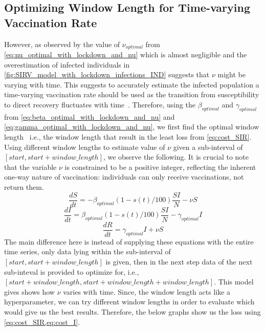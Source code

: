 \documentclass[tikz,fleqn,12pt]{wlscirep}
\begin{document}
\subsection{Optimizing Window Length for Time-varying Vaccination Rate}\label{optimizing_window_length}
However, as observed by the value of $\nu_{optimal}$ from \cref{eq:nu_optimal_with_lockdown_and_nu} which is almost negligible and the overestimation of infected individuals in \cref{fig:SIRV_model_with_lockdown_infections_IND} suggests that $\nu$ might be varying with time. This suggests to accurately estimate the infected population a time-varying vaccination rate should be used as the transition from susceptibility to direct recovery fluctuates with time~\cite{Liang2021,Marinov2022}. Therefore, using the $\beta_{optimal}$ and $\gamma_{optimal}$ from \cref{eq:beta_optimal_with_lockdown_and_nu} and \cref{eq:gamma_optimal_with_lockdown_and_nu}, we first find the optimal window length~\cite{Liao2020} i.e., the window length that result in the least loss from \cref{eq:cost_SIR}. Using different window lengths to estimate value of $\nu$ given a sub-interval of $[{start}, {start} + {window\_length}]$, we observe the following. It is crucial to note that the variable $\nu$ is constrained to be a positive integer, reflecting the inherent one-way nature of vaccination: individuals can only receive vaccinations, not return them.
\begin{equation}
  \frac{dS}{dt} = -\beta_{optimal}  (1 - s(t)/100)  \frac{S I}{N} - \nu S
  \label{eq:S_with_lockdown_and_nu_calc_nu}
\end{equation}
\begin{equation}
  \frac{dI}{dt} = \beta_{optimal}  (1 - s(t)/100) \frac{S I}{N} - \gamma_{optimal} I
  \label{eq:I_with_lockdown_and_nu_calc_nu}
\end{equation}
\begin{equation}
  \frac{dR}{dt} = \gamma_{optimal} I + \nu S
  \label{eq:R_with_lockdown_and_nu_calc_nu}
\end{equation}
The main difference here is instead of supplying these equations with the entire time series, only data lying within the sub-interval of $[{start}, {start} + {window\_length}]$ is given, then in the next step data of the next sub-inteval is provided to optimize for, i.e., $[{start} + {window\_length}, {start} + {window\_length} + {window\_length}]$. This model gives shows how $\nu$ varies with time. Since, the window length acts like a hyperparameter, we can try different window lengths in order to evaluate which would give us the best results. Therefore, the below graphs show us the loss using \cref{eq:cost_SIR,eq:cost_I}.
\end{document}
